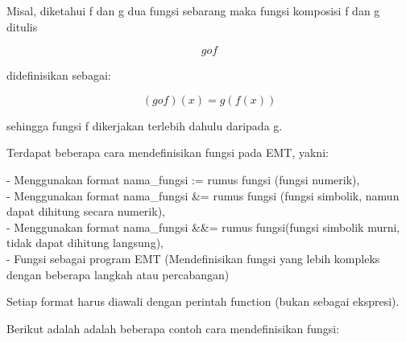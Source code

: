 \documentclass[a4paper,10pt]{article}
\begin{document}
\begin{eulernotebook}
\begin{eulercomment}
\begin{eulercomment}
\begin{eulercomment}
Misal, diketahui f dan g dua fungsi sebarang maka fungsi komposisi f
dan g ditulis\\
\end{eulercomment}
\begin{eulerformula}
\[
g o f
\]
\end{eulerformula}
\begin{eulercomment}
didefinisikan sebagai:

\end{eulercomment}
\begin{eulerformula}
\[
(g o f)(x) = g(f(x))
\]
\end{eulerformula}
\begin{eulercomment}
sehingga fungsi f dikerjakan terlebih dahulu daripada g.

\end{eulercomment}
\begin{eulercomment}
Terdapat beberapa cara mendefinisikan fungsi pada EMT, yakni:

- Menggunakan format nama\_fungsi := rumus fungsi (fungsi numerik),\\
- Menggunakan format nama\_fungsi \&= rumus fungsi (fungsi simbolik,
namun dapat dihitung secara numerik),\\
- Menggunakan format nama\_fungsi \&\&= rumus fungsi(fungsi simbolik
murni, tidak dapat dihitung langsung),\\
- Fungsi sebagai program EMT (Mendefinisikan fungsi yang lebih
kompleks dengan beberapa langkah atau percabangan)

Setiap format harus diawali dengan perintah function (bukan sebagai
ekspresi).


Berikut adalah adalah beberapa contoh cara mendefinisikan fungsi:


\end{eulercomment}
\end{eulercomment}
\end{eulercomment}
\end{eulernotebook}
\end{document}
